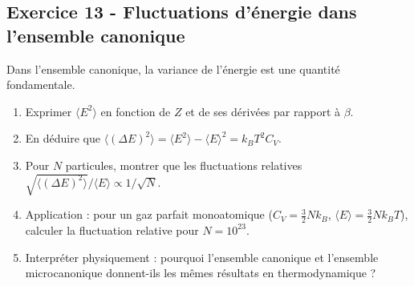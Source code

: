 \documentclass[12pt,a4paper]{article}
\begin{document}
\subsection*{Exercice 13 - Fluctuations d'énergie dans l'ensemble canonique \niveau{\moyen}}

\begin{boiteexercice}
Dans l'ensemble canonique, la variance de l'énergie est une quantité fondamentale.
\begin{enumerate}
  \item Exprimer $\langle E^2\rangle$ en fonction de $Z$ et de ses dérivées par rapport à $\beta$.
  \item En déduire que $\langle(\Delta E)^2\rangle = \langle E^2\rangle - \langle E\rangle^2 = k_BT^2 C_V$.
  \item Pour $N$ particules, montrer que les fluctuations relatives $\sqrt{\langle(\Delta E)^2\rangle}/\langle E\rangle\propto 1/\sqrt{N}$.
  \item Application : pour un gaz parfait monoatomique ($C_V = \frac{3}{2}Nk_B$, $\langle E\rangle = \frac{3}{2}Nk_BT$), calculer la fluctuation relative pour $N = 10^{23}$.
  \item Interpréter physiquement : pourquoi l'ensemble canonique et l'ensemble microcanonique donnent-ils les mêmes résultats en thermodynamique ?
\end{enumerate}
\end{boiteexercice}
\end{document}
